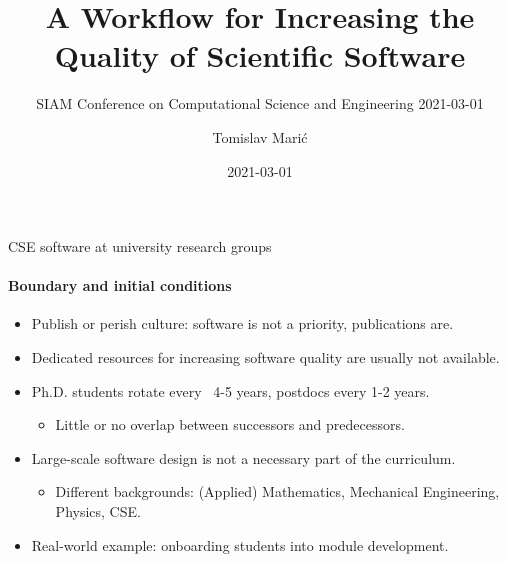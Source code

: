\documentclass[
	ngerman,%
	aspectratio=169,%
	color={accentcolor=2d},
	logo=true,%
	colorframetitle=true,%
	]{tudabeamer}
\title{A Workflow for Increasing the Quality of Scientific Software}
\subtitle{SIAM Conference on Computational Science and Engineering 2021-03-01}
\author[T. Mari\'c, JP. Lehr, I. Pappagianidis, B. Lambie, D. Bothe, C. Bischof]{Tomislav Mari\'c}
\institute{CRC 1194 : Z-INF}
\date{2021-03-01}
\begin{document}
\maketitle

\begin{frame}{CSE software at university research groups}
	\framesubtitle{Boundary and initial conditions}
	
	\vfill
	\begin{itemize}
		\item Publish or perish culture: software is not a priority, publications are.
		\item Dedicated resources for increasing software quality are usually not available.
		\item Ph.D. students rotate every ~4-5 years, postdocs every 1-2 years. 
			\begin{itemize}
				\item Little or no overlap between successors and predecessors. 
			\end{itemize}
		\item Large-scale software design is not a necessary part of the curriculum. 
			\begin{itemize}
				\item Different backgrounds: (Applied) Mathematics, Mechanical Engineering, Physics, CSE.
			\end{itemize}
		\item Real-world example: onboarding students into \href{https://www.openfoam.com/documentation/guides/latest/api/classes.html}{} module development.
	\end{itemize}
\end{frame}
\end{document}
